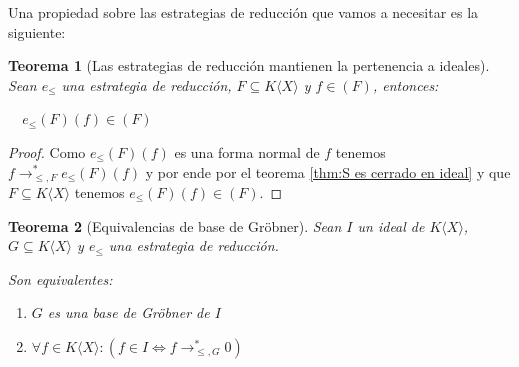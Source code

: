 \documentclass{amsbook}
\theoremstyle{customstyle}
\newtheorem{theorem}{Teorema}[section]
\begin{document}
Una propiedad sobre las estrategias de reducción que vamos a necesitar es la siguiente:

\begin{theorem}[Las estrategias de reducción mantienen la pertenencia a ideales]\label{thm:e mantiene pertenencia a ideal}
Sean $e_≤$ una estrategia de reducción, $F ⊆ K⟨X⟩$ y $f ∈ (F)$, entonces:

  $e_≤(F)(f) ∈ (F)$

\end{theorem}
\begin{proof}
Como $e_≤(F)(f)$ es una forma normal de $f$ tenemos $f →^*_{≤, F} e_≤(F)(f)$ y por ende por el teorema \ref{thm:S es cerrado en ideal} y que $F ⊆ K⟨X⟩$ tenemos $e_≤(F)(f) ∈ (F)$.
\end{proof}


\begin{theorem}[Equivalencias de base de Gröbner]\label{thm:equivalencias de base de Gröbner}
Sean $I$ un ideal de $K⟨X⟩$, $G ⊆ K⟨X⟩$ y $e_≤$ una estrategia de reducción.

Son equivalentes:
\begin{enumerate}
\item $G$ es una base de Gröbner de $I$

\item $∀f ∈ K⟨X⟩ : (f ∈ I ⇔ f →^*_{≤, G} 0)$

\end{enumerate}

\end{theorem}
\end{document}
